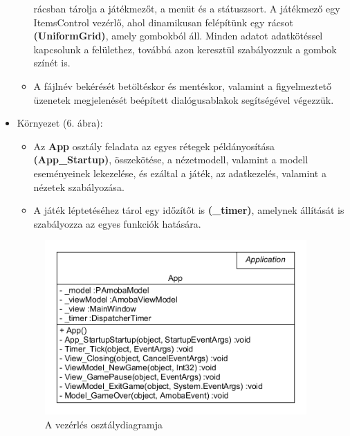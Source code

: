 \documentclass[11pt,a4paper]{article}
\begin{document}
\begin{itemize}
\begin{itemize}
		rácsban tárolja a játékmezőt, a menüt és a státuszsort. A játékmező egy
		ItemsControl vezérlő, ahol dinamikusan felépítünk egy rácsot
		\textbf{(UniformGrid)}, amely gombokból áll. Minden adatot adatkötéssel
		kapcsolunk a felülethez, továbbá azon keresztül szabályozzuk a gombok
		színét is.
		\item A fájlnév bekérését betöltéskor és mentéskor, valamint a figyelmeztető
		üzenetek megjelenését beépített dialógusablakok segítségével végezzük.
	\end{itemize}
	\item Környezet (6. ábra):
	\begin{itemize}
		\item Az \textbf{App} osztály feladata az egyes rétegek példányosítása
		\textbf{(App\_Startup)}, összekötése, a nézetmodell, valamint a modell eseményeinek lekezelése,
		és ezáltal a játék, az adatkezelés, valamint a nézetek szabályozása.
		\item A játék léptetéséhez tárol egy időzítőt is \textbf{(\_timer)}, amelynek állítását is
		szabályozza az egyes funkciók hatására.
	\end{itemize}
	\begin{figure}[h]
		\centering
		\includegraphics[width=10cm]{UMLs/App.png}
		\caption{A vezérlés osztálydiagramja}
	\end{figure}

\end{itemize}
\end{document}
